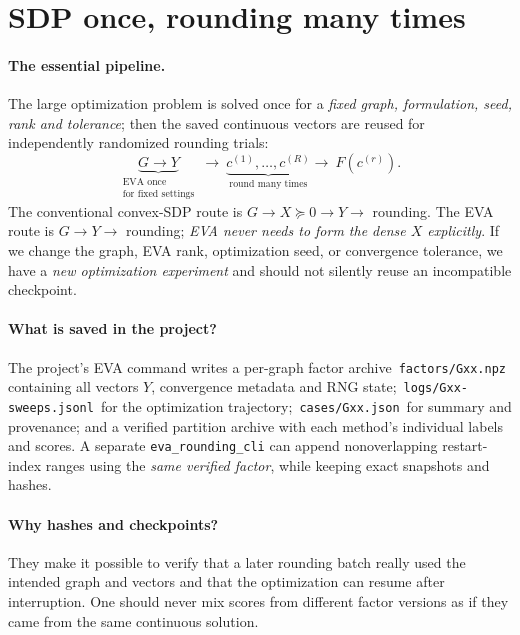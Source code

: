\documentclass[10pt,letterpaper]{article}
\begin{document}
\section{SDP once, rounding many times}
\label{sec:workflow}
\paragraph{The essential pipeline.} The large optimization problem is solved once for a \emph{fixed graph, formulation, seed, rank and tolerance}; then the saved continuous vectors are reused for independently randomized rounding trials:
\begin{equation}\label{eq:pipeline}
 \underbrace{G\longrightarrow Y}_{\substack{\text{EVA once}\\\text{for fixed settings}}}
 \ \longrightarrow\ 
 \underbrace{c^{(1)},\ldots,c^{(R)}}_{\text{round many times}}
 \longrightarrow\ F(c^{(r)}).
\end{equation}
The conventional convex-SDP route is $G\to X\succeq0\to Y\to$ rounding. The EVA route is $G\to Y\to$ rounding; \emph{EVA never needs to form the dense $X$ explicitly}. If we change the graph, EVA rank, optimization seed, or convergence tolerance, we have a \emph{new optimization experiment} and should not silently reuse an incompatible checkpoint.

\paragraph{What is saved in the project?} The project's EVA command writes a per-graph factor archive \,\texttt{factors/Gxx.npz}\, containing all vectors $Y$, convergence metadata and RNG state; \,\texttt{logs/Gxx-sweeps.jsonl}\, for the optimization trajectory; \,\texttt{cases/Gxx.json}\, for summary and provenance; and a verified partition archive with each method's individual labels and scores. A separate \texttt{eva\_rounding\_cli} can append nonoverlapping restart-index ranges using the \emph{same verified factor}, while keeping exact snapshots and hashes.

\paragraph{Why hashes and checkpoints?} They make it possible to verify that a later rounding batch really used the intended graph and vectors and that the optimization can resume after interruption. One should never mix scores from different factor versions as if they came from the same continuous solution.
\end{document}
